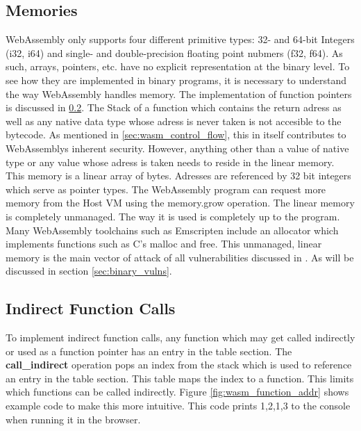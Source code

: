 \documentclass[sigconf]{acmart}
\begin{document}
\subsection{Memories} 
\label{sec:memories}
WebAssembly only supports four different primitive types: 32- and 64-bit Integers (i32, i64) and single- and double-precision floating point nubmers (f32, f64). As such, arrays, pointers, etc. have no explicit representation at the binary level. To see how they are implemented in binary programs, it is necessary to understand the way WebAssembly handles memory. The implementation of function pointers is discussed in \ref{sec:indirect_calls}. The Stack of a function which contains the return adress as well as any native data type whose adress is never taken is not accesible to the bytecode. As mentioned in \ref{sec:wasm_control_flow}, this in itself contributes to WebAssemblys inherent security. However, anything other than a value of native type or any value whose adress is taken needs to reside in the linear memory. This memory is a linear array of bytes. Adresses are referenced by 32 bit integers which serve as pointer types.   The WebAssembly program can request more memory from the Host VM using the memory.grow operation. The linear memory is completely unmanaged. The way it is used is completely up to the program. Many WebAssembly toolchains such as Emscripten include an allocator which implements functions such as C's malloc and free. This unmanaged, linear memory is the main vector of attack of all vulnerabilities discussed in \cite{lehmann_everything_2020}. As will be discussed in section  \ref{sec:binary_vulns}.


\subsection{Indirect Function Calls} 
\label{sec:indirect_calls}
To implement indirect function calls, any function which may get called indirectly or used as a function pointer has an entry in the table section. The \textbf{call\_indirect} operation pops an index from the stack which is used to reference an entry in the table section. This table maps the index to a function. This limits which functions can be called indirectly. Figure \ref{fig:wasm_function_addr} shows example code to make this more intuitive. This code prints 1,2,1,3 to the console when running it in the browser.
\end{document}

